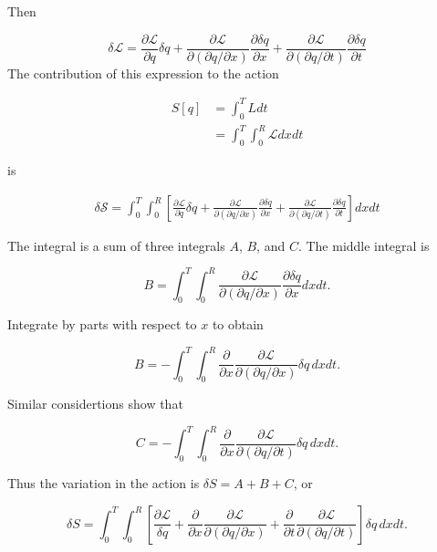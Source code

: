 Then

\begin{equation}
\delta \mathcal{L} = \frac{\partial \mathcal{L}}{\partial q }
\delta q
+ \frac{\partial \mathcal{L}}{\partial (\partial q/\partial x) }
\frac{\partial \delta q}{\partial x}
+ \frac{\partial \mathcal{L}}{\partial (\partial q/\partial t) }
\frac{\partial \delta q}{\partial t}
\end{equation}
The contribution of this expression to the action

\begin{align}
S[q] &= \int_0^T L dt \\
&= \int_0^T \int_0^R \mathcal{L} dx dt
\end{align}

is

\begin{align}
\delta \mathcal{S} =  \int_0^T \int_0^R
\left[
\frac{\partial \mathcal{L}}{\partial q }
\delta q
+ \frac{\partial \mathcal{L}}{\partial (\partial q/\partial x) }
\frac{\partial \delta q}{\partial x}
+ \frac{\partial \mathcal{L}}{\partial (\partial q/\partial t) }
\frac{\partial \delta q}{\partial t}
\right] dx dt
\end{align}

The integral is a sum of three integrals $A$, $B$, and $C$. The middle integral is

\begin{equation}
B = \int_0^T \int_0^R \frac{\partial \mathcal{L}}{\partial (\partial q/\partial x) }
\frac{\partial \delta q}{\partial x} dx dt .
\end{equation}

Integrate by parts with respect to $x$ to obtain

\begin{equation}
B = - \int_0^T \int_0^R \frac{\partial}{\partial x}\frac{\partial \mathcal{L}}{\partial (\partial q/\partial x) } \delta q \,dx dt .
\end{equation}

Similar considertions show that

\begin{equation}
C = - \int_0^T \int_0^R \frac{\partial}{\partial x}\frac{\partial \mathcal{L}}{\partial (\partial q/\partial t) } \delta q \,dx dt .
\end{equation}

Thus the variation in the action is $\delta S = A + B + C$, or

\begin{equation}
\delta S
= \int_0^T \int_0^R\left[
\frac{\partial \mathcal{L}}{\delta q}
+ \frac{\partial }{\partial x}\frac{\partial \mathcal{L}}{\partial (\partial q/\partial x) }
+  \frac{\partial}{\partial t}\frac{\partial \mathcal{L}}{\partial (\partial q/\partial t) }
\right]\delta q \,dx dt .
\end{equation}

